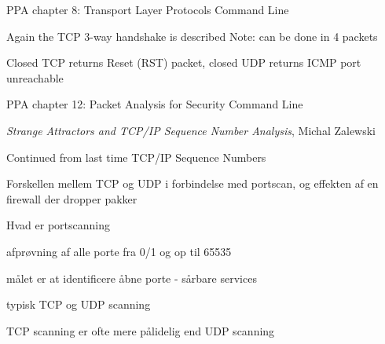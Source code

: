 \documentclass[Screen16to9,17pt]{foils}
\begin{document}


\begin{list1}
\item PPA chapter 8: Transport Layer Protocols
Command Line
\begin{list2}
\item Again the TCP 3-way handshake is described Note: can be done in 4 packets
\item Closed TCP returns Reset (RST) packet, closed UDP returns ICMP port unreachable
\end{list2}
\end{list1}



\begin{list1}
\item PPA chapter 12: Packet Analysis for Security
Command Line
\begin{list2}
\item
\end{list2}
\end{list1}




\emph{Strange Attractors and TCP/IP Sequence Number Analysis}, Michal Zalewski\\ 

\begin{list1}
\item Continued from last time TCP/IP Sequence Numbers
\begin{list2}
\item
\end{list2}
\end{list1}



Forskellen mellem TCP og UDP i forbindelse med portscan, og effekten af en firewall der dropper pakker


\begin{list1}
  \item Hvad er portscanning
\item afprøvning af alle porte fra 0/1 og op til 65535
\item målet er at identificere åbne porte - sårbare services
\item typisk TCP og UDP scanning
\item TCP scanning er ofte mere pålidelig end UDP scanning
\end{list1}
\end{document}
